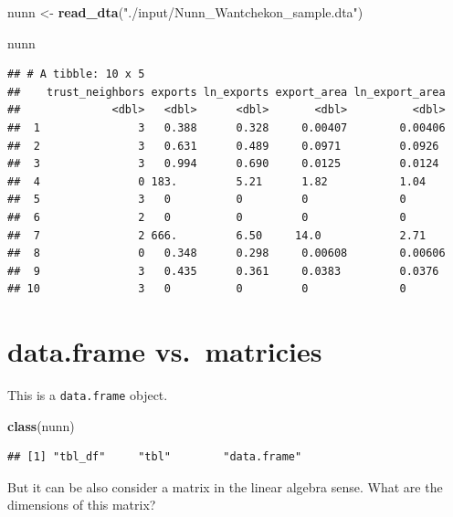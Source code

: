 \documentclass[]{book}
\newenvironment{Shaded}{\begin{snugshade}}{\end{snugshade}}
\newcommand{\KeywordTok}[1]{\textcolor[rgb]{0.13,0.29,0.53}{\textbf{#1}}}
\newcommand{\StringTok}[1]{\textcolor[rgb]{0.31,0.60,0.02}{#1}}
\newcommand{\NormalTok}[1]{#1}
\theoremstyle{definition}
\theoremstyle{definition}
\theoremstyle{definition}
\theoremstyle{remark}
\begin{document}
\begin{Shaded}
\begin{Highlighting}[]
\NormalTok{nunn <-}\StringTok{ }\KeywordTok{read_dta}\NormalTok{(}\StringTok{"./input/Nunn_Wantchekon_sample.dta"}\NormalTok{)}
\end{Highlighting}
\end{Shaded}

\begin{Shaded}
\begin{Highlighting}[]
\NormalTok{nunn}
\end{Highlighting}
\end{Shaded}

\begin{verbatim}
## # A tibble: 10 x 5
##    trust_neighbors exports ln_exports export_area ln_export_area
##              <dbl>   <dbl>      <dbl>       <dbl>          <dbl>
##  1               3   0.388      0.328     0.00407        0.00406
##  2               3   0.631      0.489     0.0971         0.0926 
##  3               3   0.994      0.690     0.0125         0.0124 
##  4               0 183.         5.21      1.82           1.04   
##  5               3   0          0         0              0      
##  6               2   0          0         0              0      
##  7               2 666.         6.50     14.0            2.71   
##  8               0   0.348      0.298     0.00608        0.00606
##  9               3   0.435      0.361     0.0383         0.0376 
## 10               3   0          0         0              0
\end{verbatim}

\section{data.frame vs.~matricies}\label{data.frame-vs.matricies}

This is a \texttt{data.frame} object.

\begin{Shaded}
\begin{Highlighting}[]
\KeywordTok{class}\NormalTok{(nunn)}
\end{Highlighting}
\end{Shaded}

\begin{verbatim}
## [1] "tbl_df"     "tbl"        "data.frame"
\end{verbatim}

But it can be also consider a matrix in the linear algebra sense. What
are the dimensions of this matrix?
\end{document}
